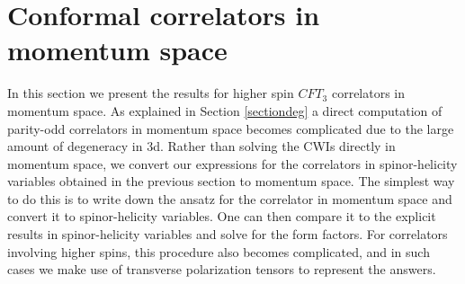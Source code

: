 \documentclass[a4paper,11pt]{article}
\begin{document}
\section{Conformal correlators in momentum space}
\label{shmomentumspaceresults}
In this section we present the results for higher spin $CFT_3$ correlators in momentum space. As explained in Section \ref{sectiondeg} a direct computation of parity-odd correlators in momentum space becomes complicated due to the large amount of degeneracy in 3d. Rather than solving the CWIs directly in momentum space, we convert our expressions for the correlators in spinor-helicity variables obtained in the previous section to momentum space. The simplest way to do this is to write down the ansatz for the correlator in momentum space and convert it to spinor-helicity variables. One can then compare it to the explicit results in spinor-helicity variables and solve for the form factors. For correlators involving higher spins, this procedure also becomes complicated, and in such cases we make use of transverse polarization tensors to represent the answers.
\end{document}
